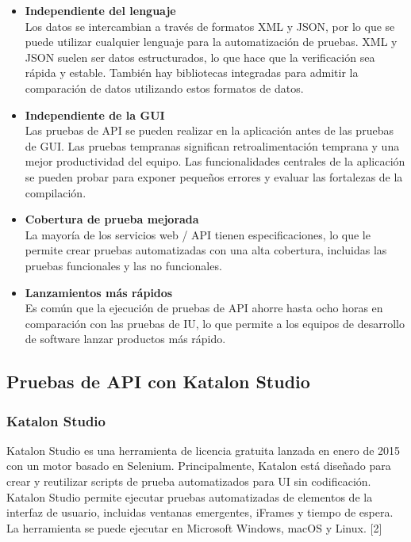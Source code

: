 \documentclass[twoside,twocolumn]{article}
\begin{document}
\begin{itemize}
  \item \textbf{Independiente del lenguaje} \\
  Los datos se intercambian a través de formatos XML y JSON, por lo que se puede utilizar cualquier lenguaje para la automatización de pruebas. XML y JSON suelen ser datos estructurados, lo que hace que la verificación sea rápida y estable. También hay bibliotecas integradas para admitir la comparación de datos utilizando estos formatos de datos.
  \item \textbf{Independiente de la GUI} \\
  Las pruebas de API se pueden realizar en la aplicación antes de las pruebas de GUI. Las pruebas tempranas significan retroalimentación temprana y una mejor productividad del equipo. Las funcionalidades centrales de la aplicación se pueden probar para exponer pequeños errores y evaluar las fortalezas de la compilación.
  \item \textbf{Cobertura de prueba mejorada} \\
  La mayoría de los servicios web / API tienen especificaciones, lo que le permite crear pruebas automatizadas con una alta cobertura, incluidas las pruebas funcionales y las no funcionales.
  \item \textbf{Lanzamientos más rápidos} \\
  Es común que la ejecución de pruebas de API ahorre hasta ocho horas en comparación con las pruebas de IU, lo que permite a los equipos de desarrollo de software lanzar productos más rápido.
\end{itemize}




\subsection{Pruebas de API con Katalon Studio}

\subsubsection{Katalon Studio}

Katalon Studio es una herramienta de licencia gratuita lanzada en enero de 2015 con un motor basado en Selenium. Principalmente, Katalon está diseñado para crear y reutilizar scripts de prueba automatizados para UI sin codificación. Katalon Studio permite ejecutar pruebas automatizadas de elementos de la interfaz de usuario, incluidas ventanas emergentes, iFrames y tiempo de espera. La herramienta se puede ejecutar en Microsoft Windows, macOS y Linux. [2]
\end{document}
